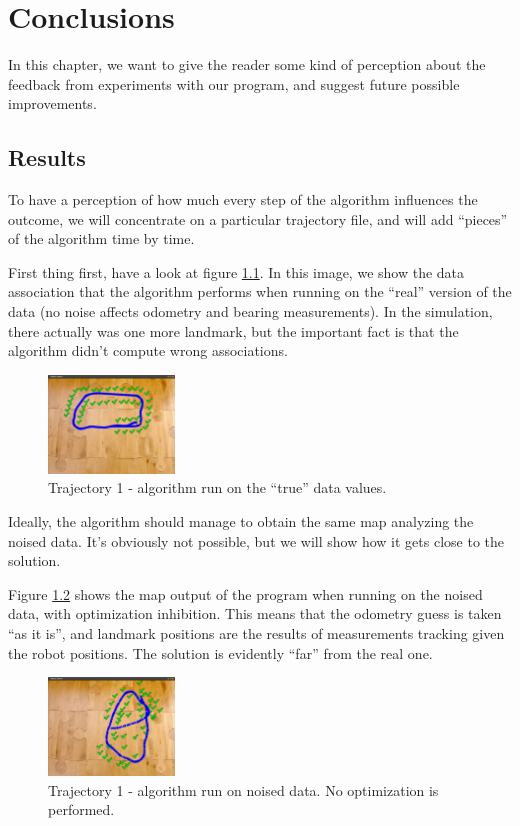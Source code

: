 \chapter{Conclusions}\label{cap:Conclusions}
In this chapter, we want to give the reader some kind of perception about the feedback from experiments with our program, and suggest future possible improvements.

\section{Results}
To have a perception of how much every step of the algorithm influences the outcome, we will concentrate on a particular trajectory file, and will add ``pieces'' of the algorithm time by time.

First thing first, have a look at figure \ref{fig:corridor_truth}.
In this image, we show the data association that the algorithm performs when running on the ``real'' version of the data (no noise affects odometry and bearing measurements).
In the simulation, there actually was one more landmark, but the important fact is that the algorithm didn't compute wrong associations.

\begin{figure}[htbp]
  \centering
    \includegraphics[width=0.3\textwidth]{images/corridor/corridor_truth.png}
  \caption{Trajectory 1 - algorithm run on the ``true'' data values.}
  \label{fig:corridor_truth}
\end{figure}

Ideally, the algorithm should manage to obtain the same map analyzing the noised data.
It's obviously not possible, but we will show how it gets close to the solution. 

Figure \ref{fig:corridor_nooptim} shows the map output of the program when running on the noised data, with optimization inhibition. This means that the odometry guess is taken ``as it is'', and landmark positions are the results of measurements tracking given the robot positions. The solution is evidently ``far'' from the real one.
\begin{figure}[htbp]
  \centering
    \includegraphics[width=0.3\textwidth]{images/corridor/corridor_nooptim.png}
  \caption{Trajectory 1 - algorithm run on noised data. No optimization is performed.}
  \label{fig:corridor_nooptim}
\end{figure}

